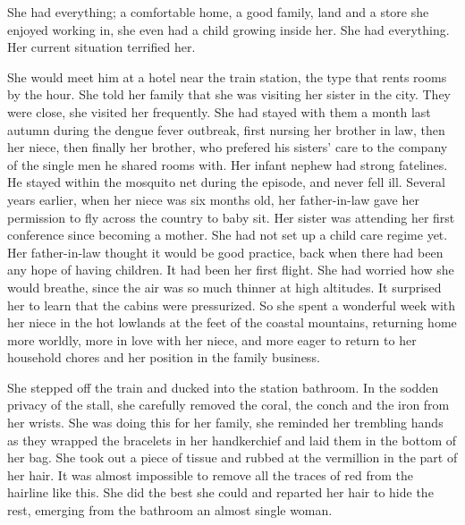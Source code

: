 \documentclass{article}
\begin{document}
She had everything; a comfortable home, a good family, land and a store she enjoyed working in, she even had a child growing inside her. She had everything. Her current situation terrified her.

She would meet him at a hotel near the train station, the type that rents rooms by the hour. She told her family that she was visiting her sister in the city. They were close, she visited her frequently. She had stayed with them a month last autumn during the dengue fever outbreak, first nursing her brother in law, then her niece, then finally her brother, who prefered his sisters' care to the company of the single men he shared rooms with. Her infant nephew had strong fatelines. He stayed within the mosquito net during the episode, and never fell ill. Several years earlier, when her niece was six months old, her father-in-law gave her permission to fly across the country to baby sit. Her sister was attending her first conference since becoming a mother. She had not set up a child care regime yet. Her father-in-law thought it would be good practice, back when there had been any hope of having children. It had been her first flight. She had worried how she would breathe, since the air was so much thinner at high altitudes. It surprised her to learn that the cabins were pressurized. So she spent a wonderful week with her niece in the hot lowlands at the feet of the coastal mountains, returning home more worldly, more in love with her niece, and more eager to return to her household chores and her position in the family business.

She stepped off the train and ducked into the station bathroom. In the sodden privacy of the stall, she carefully removed the coral, the conch and the iron from her wrists. She was doing this for her family, she reminded her trembling hands as they wrapped the bracelets in her handkerchief and laid them in the bottom of her bag. She took out a piece of tissue and rubbed at the vermillion in the part of her hair. It was almost impossible to remove all the traces of red from the hairline like this. She did the best she could and reparted her hair to hide the rest,  emerging from the bathroom an almost single woman.
\end{document}
